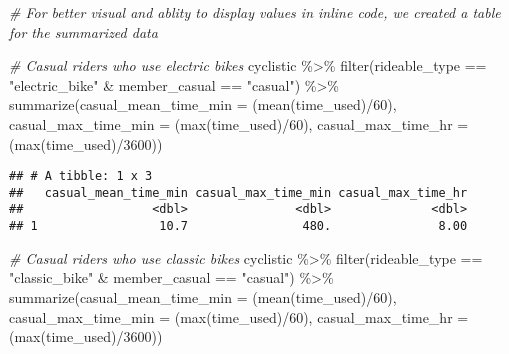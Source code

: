 \documentclass[
]{article}
\newenvironment{Shaded}{\begin{snugshade}}{\end{snugshade}}
\newcommand{\AttributeTok}[1]{\textcolor[rgb]{0.77,0.63,0.00}{#1}}
\newcommand{\CommentTok}[1]{\textcolor[rgb]{0.56,0.35,0.01}{\textit{#1}}}
\newcommand{\DecValTok}[1]{\textcolor[rgb]{0.00,0.00,0.81}{#1}}
\newcommand{\FunctionTok}[1]{\textcolor[rgb]{0.00,0.00,0.00}{#1}}
\newcommand{\NormalTok}[1]{#1}
\newcommand{\SpecialCharTok}[1]{\textcolor[rgb]{0.00,0.00,0.00}{#1}}
\newcommand{\StringTok}[1]{\textcolor[rgb]{0.31,0.60,0.02}{#1}}
\begin{document}
\begin{Shaded}
\begin{Highlighting}[]
\CommentTok{\# For better visual and ablity to display values in inline code, we created a table for the summarized data}

\CommentTok{\# Casual riders who use electric bikes}
\NormalTok{cyclistic }\SpecialCharTok{\%\textgreater{}\%} \FunctionTok{filter}\NormalTok{(rideable\_type }\SpecialCharTok{==} \StringTok{"electric\_bike"} \SpecialCharTok{\&}\NormalTok{ member\_casual }\SpecialCharTok{==} \StringTok{"casual"}\NormalTok{) }\SpecialCharTok{\%\textgreater{}\%}
                                                    \FunctionTok{summarize}\NormalTok{(}\AttributeTok{casual\_mean\_time\_min =}\NormalTok{ (}\FunctionTok{mean}\NormalTok{(time\_used)}\SpecialCharTok{/}\DecValTok{60}\NormalTok{),}
                                                              \AttributeTok{casual\_max\_time\_min =}\NormalTok{ (}\FunctionTok{max}\NormalTok{(time\_used)}\SpecialCharTok{/}\DecValTok{60}\NormalTok{),}
                                                              \AttributeTok{casual\_max\_time\_hr =}\NormalTok{ (}\FunctionTok{max}\NormalTok{(time\_used)}\SpecialCharTok{/}\DecValTok{3600}\NormalTok{))}
\end{Highlighting}
\end{Shaded}

\begin{verbatim}
## # A tibble: 1 x 3
##   casual_mean_time_min casual_max_time_min casual_max_time_hr
##                  <dbl>               <dbl>              <dbl>
## 1                 10.7                480.               8.00
\end{verbatim}

\begin{Shaded}
\begin{Highlighting}[]
\CommentTok{\# Casual riders who use classic bikes}
\NormalTok{cyclistic }\SpecialCharTok{\%\textgreater{}\%} \FunctionTok{filter}\NormalTok{(rideable\_type }\SpecialCharTok{==} \StringTok{"classic\_bike"} \SpecialCharTok{\&}\NormalTok{ member\_casual }\SpecialCharTok{==} \StringTok{"casual"}\NormalTok{) }\SpecialCharTok{\%\textgreater{}\%} 
                                                    \FunctionTok{summarize}\NormalTok{(}\AttributeTok{casual\_mean\_time\_min =}\NormalTok{ (}\FunctionTok{mean}\NormalTok{(time\_used)}\SpecialCharTok{/}\DecValTok{60}\NormalTok{),}
                                                              \AttributeTok{casual\_max\_time\_min =}\NormalTok{ (}\FunctionTok{max}\NormalTok{(time\_used)}\SpecialCharTok{/}\DecValTok{60}\NormalTok{),}
                                                              \AttributeTok{casual\_max\_time\_hr =}\NormalTok{ (}\FunctionTok{max}\NormalTok{(time\_used)}\SpecialCharTok{/}\DecValTok{3600}\NormalTok{))}
\end{Highlighting}
\end{Shaded}
\end{document}
